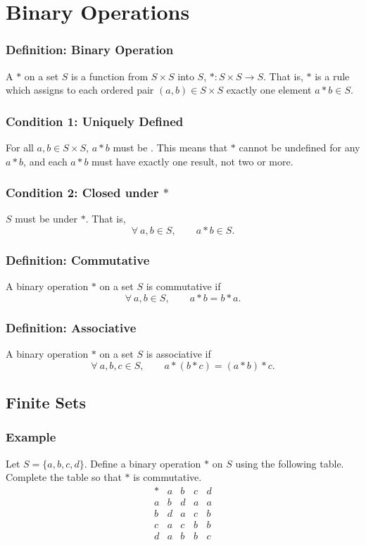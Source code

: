 \section{Binary Operations}

\subsubsection*{Definition: Binary Operation}
A  $*$ on a set $S$ is a function from $S \times S$ into $S$, $*: S \times S \rightarrow S$. That is, $*$ is a rule which assigns to each ordered pair $(a,b) \in S \times S$ exactly one element $a * b \in S$.

\subsubsection*{Condition 1: Uniquely Defined}
For all $a,b \in S \times S$, $a * b$ must be . This means that $*$ cannot be undefined for any $a * b$, and each $a * b$ must have exactly one result, not two or more.

\subsubsection*{Condition 2: Closed under $*$}
$S$ must be  under $*$. That is,
\[
    \forall~ a,b \in S, \qquad a * b \in S.
\]

\subsubsection*{Definition: Commutative}
A binary operation $*$ on a set $S$ is commutative if
\[
    \forall~ a,b \in S, \qquad a * b = b * a.
\]

\subsubsection*{Definition: Associative}
A binary operation $*$ on a set $S$ is associative if
\[
    \forall~ a,b,c \in S, \qquad a * (b * c) = (a * b) * c.
\]

\subsection{Finite Sets}

\subsubsection*{Example}
Let $S = \{a,b,c,d\}$. Define a binary operation $*$ on $S$ using the following table. Complete the table so that $*$ is commutative.
\[
    \begin{array}{c|cccc}
        * & a & b & c & d \\
        \hline
        a & b & d & a & a \\
        b & d & a & c & b \\
        c & a & c & b & b \\
        d & a & b & b & c 
    \end{array}
\]


